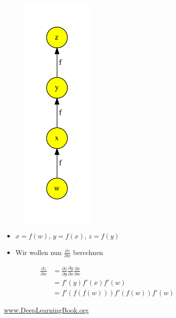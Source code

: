 \documentclass[t]{beamer}
\begin{document}
\begin{frame}
    \begin{figure}
        \centering
        \begin{minipage}{0.45\textwidth}
            \begin{figure}[]
                \centering
                \includegraphics[width=0.4\textwidth]{./images/back-prop.pdf}
            \end{figure}
        \end{minipage}\hfill
        \begin{minipage}{0.45\textwidth}
            \begin{itemize}
                \item \(x = f(w)\), \(y = f(x)\), \(z = f(y)\)
                \item Wir wollen nun \(\frac{\partial z}{\partial w}\) berechnen
            \end{itemize}
            \begin{align*}
                \frac{\partial z}{\partial w} &= \frac{\partial z}{\partial y} \frac{\partial y}{\partial x} \frac{\partial x}{\partial w} \\
                &= f\prime(y) f\prime(x) f\prime(w) \\
                &= f\prime(f(f(w)))f\prime(f(w))f\prime(w)
            \end{align*}
        \end{minipage}
        \caption{\href{http://www.deeplearningbook.org}{www.DeepLearningBook.org}}
    \end{figure}
\end{frame}
\end{document}
